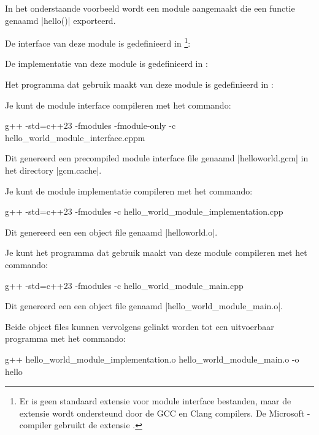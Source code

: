 \begin{cpplstShortInline}
In het onderstaande voorbeeld wordt een module aangemaakt die een functie genaamd |hello()| exporteerd.

De interface van deze module is gedefinieerd in \footnote{%
	Er is geen standaard extensie voor module interface bestanden, maar de extensie  wordt ondersteund door de GCC en Clang compilers. De Microsoft \Cpp{}\hyp{}compiler gebruikt de extensie .
}:

De implementatie van deze module is gedefinieerd in :

Het programma dat gebruik maakt van deze module is gedefinieerd in :

Je kunt de module interface compileren met het commando:
\begin{coutput}
g++ -std=c++23 -fmodules -fmodule-only -c hello_world_module_interface.cppm
\end{coutput}
Dit genereerd een precompiled module interface file genaamd |helloworld.gcm| in het directory |gcm.cache|.

Je kunt de module implementatie compileren met het commando:
\begin{coutput}
g++ -std=c++23 -fmodules -c hello_world_module_implementation.cpp
\end{coutput}
Dit genereerd een een object file genaamd |helloworld.o|.

Je kunt het programma dat gebruik maakt van deze module compileren met het commando:
\begin{coutput}
g++ -std=c++23 -fmodules -c hello_world_module_main.cpp
\end{coutput}
Dit genereerd een een object file genaamd |hello_world_module_main.o|.

Beide object files kunnen vervolgens gelinkt worden tot een uitvoerbaar programma met het commando:
\begin{coutput}
g++ hello_world_module_implementation.o hello_world_module_main.o -o hello
\end{coutput}


\end{cpplstShortInline}
